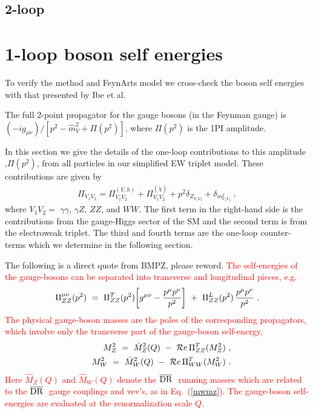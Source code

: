 \documentclass[11pt]{article}
\begin{document}
\subsection{2-loop}

\section{1-loop boson self energies}

To verify the method and FeynArts model we cross-check the boson self energies with that presented by Ibe et al.


The full 2-point propagator for the gauge bosons (in the Feynman gauge) is $(-ig_{\mu\nu})/[p^2 - \hat{m}_V^2 + \Pi(p^2)]$, where $\Pi(p^2)$ is the 1PI amplitude.



In this section we give the details of the one-loop contributions to this amplitude
,$\Pi(p^2)$, from all particles in our simplified EW triplet model.  These contributions are given by
{\small
\begin{eqnarray}
\Pi_{V_1 V_2}
= \Pi_{V_1 V_2}^{(V, h)}
+ \Pi_{V_1 V_2}^{(\tilde{\chi})}
+ p^2 \delta_{Z_{V_1 V_2}}
+ \delta_{m^2_{V_1 V_2}}\ ,
\end{eqnarray}
}where $V_1 V_2 =$ $\gamma \gamma$, $\gamma Z$, $ZZ$, and $WW$. The first term in the right-hand side is the contributions from the gauge-Higgs sector of the SM and the second term is from the electroweak triplet. 
The third and fourth terms are the one-loop counter-terms which we determine in the following section.


The following is a direct quote from BMPZ, please reword.
 \textcolor{red}{
The self-energies of the gauge-bosons can be separated into transverse
and longitudinal pieces, e.g.
%
\begin{equation}
\Pi^{\mu\nu}_{ZZ}(p^2) \ =\ \Pi_{ZZ}^T(p^2)\biggl[g^{\mu\nu}
-{p^{\mu}p^{\nu}\over p^2}\biggr] \ +\ \Pi_{ZZ}^L(p^2)\,
{p^{\mu}p^{\nu}\over p^2}\ .
\end{equation}
%
The physical gauge-boson masses are the poles of the corresponding
propagators, which involve only the transverse part of the gauge-boson
self-energy,
%
\begin{eqnarray}
&& M_Z^2 \ =\ \hat M_Z^2(Q) \ -\ {\cal
R}e\,\Pi^T_{ZZ}(M_Z^2)~,\label{mz}\\ && M_W^2 \ =\ \hat M_W^2(Q) \ -
\ {\cal R}e\,\Pi^T_{WW}(M_W^2)~.
\end{eqnarray}
%
Here $\hat M_Z(Q)$ and $\hat M_W(Q)$ denote the
\mbox{\footnotesize$\overline{\rm DR}~$} running masses which are
related to the \mbox{\footnotesize$\overline{\rm DR}~$} gauge
couplings and vev's, as in Eq.~(\ref{mwmz}). The gauge-boson
self-energies are evaluated at the renormalization scale $Q$.
}
\end{document}
